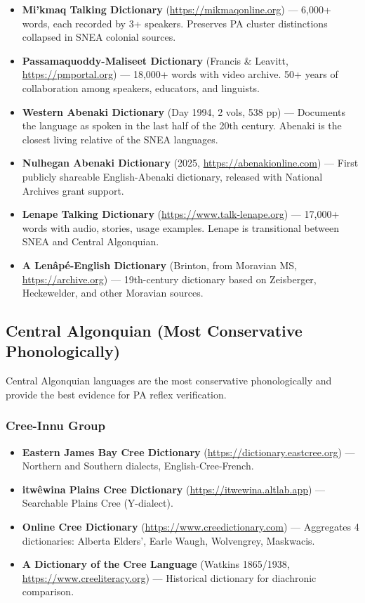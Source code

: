 \begin{itemize}
  \item \textbf{Mi'kmaq Talking Dictionary} (\url{https://mikmaqonline.org})
    --- 6,000+ words, each recorded by 3+ speakers. Preserves PA cluster
    distinctions collapsed in SNEA colonial sources.
  \item \textbf{Passamaquoddy-Maliseet Dictionary} (Francis \& Leavitt,
    \url{https://pmportal.org}) --- 18,000+ words with video archive. 50+
    years of collaboration among speakers, educators, and linguists.
  \item \textbf{Western Abenaki Dictionary} (Day 1994, 2 vols, 538 pp) ---
    Documents the language as spoken in the last half of the 20th century.
    Abenaki is the closest living relative of the SNEA languages.
  \item \textbf{Nulhegan Abenaki Dictionary} (2025,
    \url{https://abenakionline.com}) --- First publicly shareable English-Abenaki
    dictionary, released with National Archives grant support.
  \item \textbf{Lenape Talking Dictionary} (\url{https://www.talk-lenape.org})
    --- 17,000+ words with audio, stories, usage examples. Lenape is
    transitional between SNEA and Central Algonquian.
  \item \textbf{A Lenâpé-English Dictionary} (Brinton, from Moravian MS,
    \url{https://archive.org}) --- 19th-century dictionary based on Zeisberger,
    Heckewelder, and other Moravian sources.
\end{itemize}

\subsection{Central Algonquian (Most Conservative Phonologically)}

Central Algonquian languages are the most conservative phonologically and
provide the best evidence for PA reflex verification.

\subsubsection*{Cree-Innu Group}

\begin{itemize}
  \item \textbf{Eastern James Bay Cree Dictionary}
    (\url{https://dictionary.eastcree.org}) --- Northern and Southern dialects,
    English-Cree-French.
  \item \textbf{itwêwina Plains Cree Dictionary}
    (\url{https://itwewina.altlab.app}) --- Searchable Plains Cree (Y-dialect).
  \item \textbf{Online Cree Dictionary} (\url{https://www.creedictionary.com})
    --- Aggregates 4 dictionaries: Alberta Elders', Earle Waugh, Wolvengrey,
    Maskwacis.
  \item \textbf{A Dictionary of the Cree Language} (Watkins 1865/1938,
    \url{https://www.creeliteracy.org}) --- Historical dictionary for
    diachronic comparison.
\end{itemize}

